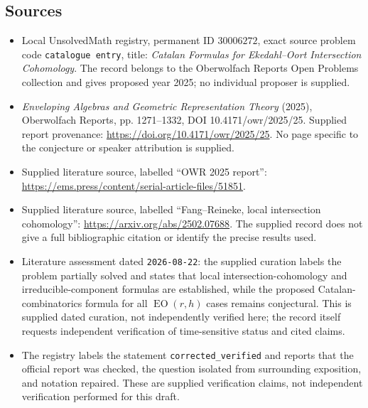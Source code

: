 \documentclass[11pt]{article}
\begin{document}
\subsection{Sources}
\begin{itemize}
\item Local UnsolvedMath registry, permanent ID \(30006272\), exact source problem code \texttt{catalogue entry}, title: \emph{Catalan Formulas for Ekedahl--Oort Intersection Cohomology}. The record belongs to the Oberwolfach Reports Open Problems collection and gives proposed year 2025; no individual proposer is supplied.
\item \emph{Enveloping Algebras and Geometric Representation Theory} (2025), Oberwolfach Reports, pp. 1271--1332, DOI 10.4171/owr/2025/25. Supplied report provenance: \url{https://doi.org/10.4171/owr/2025/25}. No page specific to the conjecture or speaker attribution is supplied.
\item Supplied literature source, labelled ``OWR 2025 report'': \url{https://ems.press/content/serial-article-files/51851}.
\item Supplied literature source, labelled ``Fang--Reineke, local intersection cohomology'': \url{https://arxiv.org/abs/2502.07688}. The supplied record does not give a full bibliographic citation or identify the precise results used.
\item Literature assessment dated \texttt{2026-08-22}: the supplied curation labels the problem partially solved and states that local intersection-cohomology and irreducible-component formulas are established, while the proposed Catalan-combinatorics formula for all \(\operatorname{EO}(r,h)\) cases remains conjectural. This is supplied dated curation, not independently verified here; the record itself requests independent verification of time-sensitive status and cited claims.
\item The registry labels the statement \texttt{corrected\_verified} and reports that the official report was checked, the question isolated from surrounding exposition, and notation repaired. These are supplied verification claims, not independent verification performed for this draft.
\end{itemize}
\end{document}
